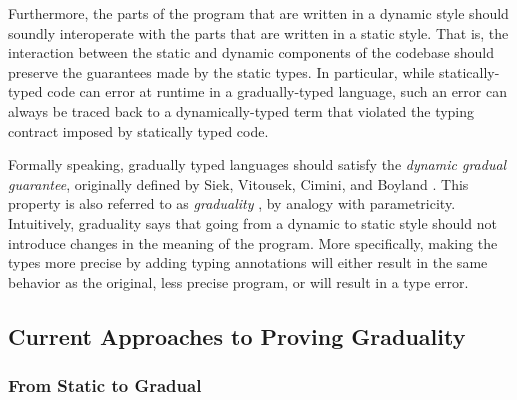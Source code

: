 Furthermore, the parts of the program that are written in a dynamic style should soundly
interoperate with the parts that are written in a static style.
That is, the interaction between the static and dynamic components of the codebase
should preserve the guarantees made by the static types.
In particular, while statically-typed code can error at runtime in a gradually-typed language,
such an error can always be traced back to a dynamically-typed term that
violated the typing contract imposed by statically typed code.


Formally speaking, gradually typed languages should satisfy the 
\emph{dynamic gradual guarantee}, originally defined by Siek, Vitousek, Cimini,
and Boyland \cite{siek_et_al:LIPIcs:2015:5031}.
This property is also referred to as \emph{graduality} \cite{new-ahmed2018},
by analogy with parametricity.
Intuitively, graduality says that going from a dynamic to static style should not
introduce changes in the meaning of the program.
More specifically, making the types more precise by adding typing annotations
will either result in the same behavior as the original, less precise program,
or will result in a type error.


\subsection{Current Approaches to Proving Graduality}

\subsubsection{From Static to Gradual}

